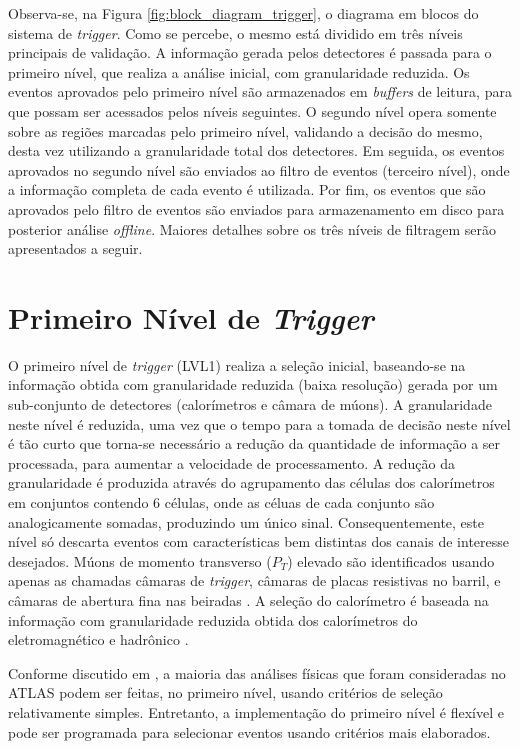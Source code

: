 Observa-se, na Figura \ref{fig:block_diagram_trigger}, o diagrama em blocos do sistema de \emph{trigger}. Como se percebe, o mesmo está dividido em três níveis principais de validação. A informação gerada pelos detectores é passada para o primeiro nível, que realiza a análise inicial, com granularidade reduzida. Os eventos aprovados pelo primeiro nível são armazenados em \emph{buffers} de leitura, para que possam ser acessados pelos níveis seguintes. O segundo nível opera somente sobre as regiões marcadas pelo primeiro nível, validando a decisão do mesmo, desta vez utilizando a granularidade total dos detectores. Em seguida, os eventos aprovados no segundo nível são enviados ao filtro de eventos (terceiro nível), onde a informação completa de cada evento é utilizada. Por fim, os eventos que são aprovados pelo filtro de eventos são enviados para armazenamento em disco para posterior análise \emph{offline}. Maiores detalhes sobre os três níveis de filtragem serão apresentados a seguir.


\section{Primeiro Nível de \emph{Trigger}}

O primeiro nível de \emph{trigger} (LVL1) realiza a seleção inicial, baseando-se na informação obtida com granularidade reduzida (baixa resolução) gerada por um sub-conjunto de detectores (calorímetros e câmara de múons). A granularidade neste nível é reduzida, uma vez que o tempo para a tomada de decisão neste nível é tão curto que torna-se necessário a redução da quantidade de informação a ser processada, para aumentar a velocidade de processamento. A redução da granularidade é produzida através do agrupamento das células dos calorímetros em conjuntos contendo 6 células, onde as céluas de cada conjunto são analogicamente somadas, produzindo um único sinal. Consequentemente,  este nível só descarta eventos com características bem distintas dos canais de interesse desejados. Múons de momento transverso ($P_T$) elevado são identificados usando apenas as chamadas câmaras de \emph{trigger}, câmaras de placas resistivas no barril, e câmaras de abertura fina nas beiradas \cite{bib:muon_spectrometer_tdr}. A seleção do calorímetro é baseada na informação com granularidade reduzida obtida dos calorímetros do eletromagnético e hadrônico \cite{bib:tdr_liquid_argon, bib:tile_calorimeter_tdr}.


Conforme discutido em \cite{bib:atlas_trigger_status_report}, a maioria das análises físicas que foram consideradas no ATLAS podem ser feitas, no primeiro nível, usando critérios de seleção relativamente simples. Entretanto, a implementação do primeiro nível é flexível e pode ser programada para selecionar eventos usando critérios mais elaborados.

